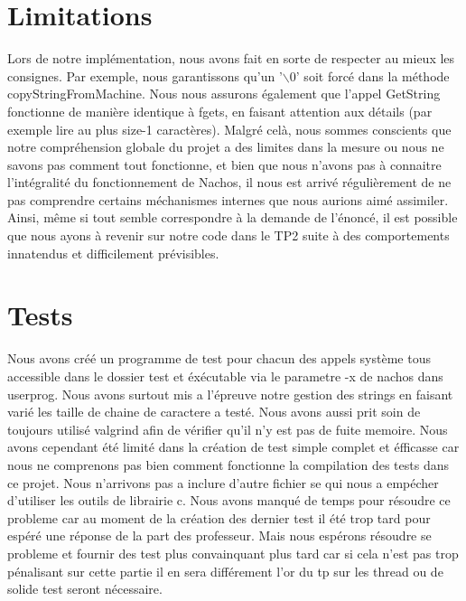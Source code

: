 \documentclass[12pt]{article}
\begin{document}
\section {Limitations}
Lors de notre implémentation, nous avons fait en sorte de respecter au mieux les consignes. Par exemple, nous garantissons qu'un '$\backslash$0' soit forcé dans la méthode \textcolor{red2}{copyStringFromMachine}. Nous nous assurons également que l'appel \textcolor{blue2}{GetString} fonctionne de manière identique à \textcolor{red2}{fgets}, en faisant attention aux détails (par exemple lire au plus size-1 caractères).
\newline
Malgré celà, nous sommes conscients que notre compréhension globale du projet a des limites dans la mesure ou nous ne savons pas comment tout fonctionne, et bien que nous n'avons pas à connaitre l'intégralité du fonctionnement de Nachos, il nous est arrivé régulièrement de ne pas comprendre certains méchanismes internes que nous aurions aimé assimiler.
Ainsi, même si tout semble correspondre à la demande de l'énoncé, il est possible que nous ayons à revenir sur notre code dans le TP2 suite à des comportements innatendus et difficilement prévisibles.



\section {Tests}

Nous avons créé un programme de test pour chacun des appels système tous accessible dans le dossier test et éxécutable via le parametre -x de nachos dans userprog.
Nous avons surtout mis a l'épreuve notre gestion des strings en faisant varié les taille de chaine de caractere a testé. Nous avons aussi prit soin de toujours utilisé valgrind afin de vérifier qu'il n'y est pas de fuite memoire.
Nous avons cependant été limité dans la création de test simple complet et éfficasse car nous ne comprenons pas bien comment fonctionne la compilation des tests dans ce projet. Nous n'arrivons pas a inclure d'autre fichier se qui nous a empécher d'utiliser les outils de librairie c.
Nous avons manqué de temps pour résoudre ce probleme car au moment de la création des dernier test il été trop tard pour espéré une réponse de la part des professeur.
Mais nous espérons résoudre se probleme et fournir des test plus convainquant plus tard car si cela n'est pas trop pénalisant sur cette partie il en sera différement l'or du tp sur les thread ou de solide test seront nécessaire.
\end{document}
